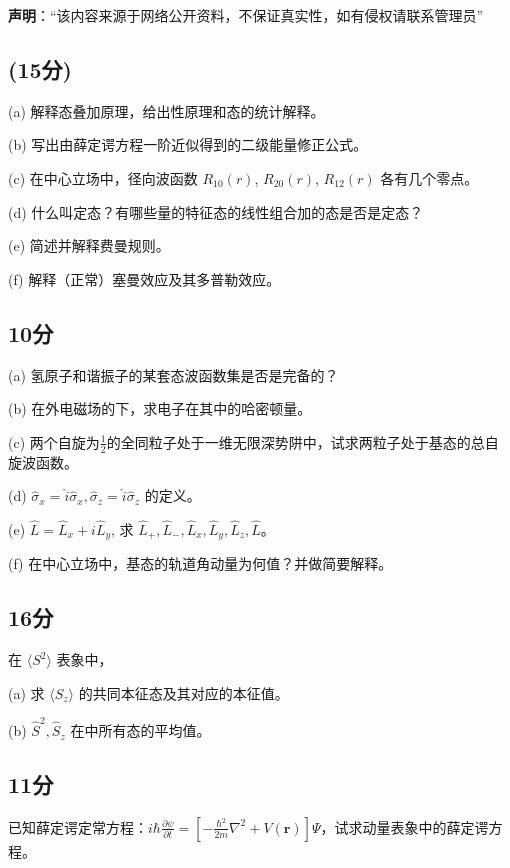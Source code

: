 
\textbf{声明}：“该内容来源于网络公开资料，不保证真实性，如有侵权请联系管理员”



\subsection{(15分)}

(a) 解释态叠加原理，给出性原理和态的统计解释。

(b) 写出由薛定谔方程一阶近似得到的二级能量修正公式。

(c) 在中心立场中，径向波函数 $R_{10}(r)$, $R_{20}(r)$, $R_{12}(r)$ 各有几个零点。

(d) 什么叫定态？有哪些量的特征态的线性组合加的态是否是定态？

(e) 简述并解释费曼规则。

(f) 解释（正常）塞曼效应及其多普勒效应。

\subsection{10分}

(a) 氢原子和谐振子的某套态波函数集是否是完备的？

(b) 在外电磁场的下，求电子在其中的哈密顿量。

(c) 两个自旋为$\frac{1}{2}$的全同粒子处于一维无限深势阱中，试求两粒子处于基态的总自旋波函数。

(d) $\hat{\sigma}_x = \hat{i} \hat{\sigma}_x, \hat{\sigma}_z = \hat{i} \hat{\sigma}_z$ 的定义。

(e) $\hat{L} = \hat{L}_x + i\hat{L}_y$, 求 ${\hat{L}_+, \hat{L}_-, \hat{L}_x, \hat{L}_y, \hat{L}_z, \hat{L} }$。

(f) 在中心立场中，基态的轨道角动量为何值？并做简要解释。


\subsection{16分}
在 $\langle S^2 \rangle$ 表象中，

(a) 求 $\langle S_z \rangle$ 的共同本征态及其对应的本征值。

(b) $\hat{S}^2, \hat{S}_z$ 在中所有态的平均值。

\subsection{11分}
已知薛定谔定常方程：$i\hbar \frac{\partial \psi}{\partial t} = \left[ -\frac{\hbar^2}{2m} \nabla^2 + V(\mathbf{r}) \right] \Psi$，试求动量表象中的薛定谔方程。

